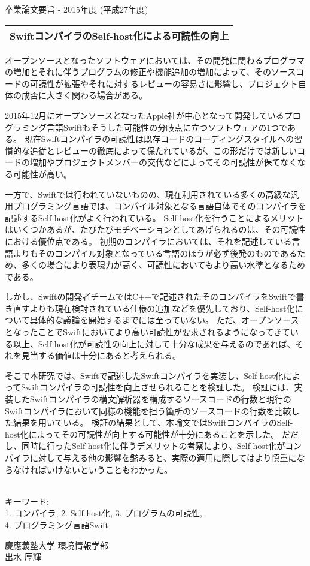 卒業論文要旨 - 2015年度 (平成27年度)
\begin{center}
\begin{Large}
\begin{tabular}{|c|} \hline
SwiftコンパイラのSelf-host化による可読性の向上
\\ \hline
\end{tabular}
\end{Large}
\end{center}

オープンソースとなったソフトウェアにおいては、その開発に関わるプログラマの増加とそれに伴うプログラムの修正や機能追加の増加によって、そのソースコードの可読性が拡張やそれに対するレビューの容易さに影響し、プロジェクト自体の成否に大きく関わる場合がある。

2015年12月にオープンソースとなったApple社が中心となって開発しているプログラミング言語Swiftもそうした可能性の分岐点に立つソフトウェアの1つである。
現在Swiftコンパイラの可読性は既存コードのコーディングスタイルへの習慣的な追従とレビューの徹底によって保たれているが、この形だけでは新しいコードの増加やプロジェクトメンバーの交代などによってその可読性が保てなくなる可能性が高い。

一方で、Swiftでは行われていないものの、現在利用されている多くの高級な汎用プログラミング言語では、コンパイル対象となる言語自体でそのコンパイラを記述するSelf-host化がよく行われている。
Self-host化を行うことによるメリットはいくつかあるが、たびたびモチベーションとしてあげられるのは、その可読性における優位点である。
初期のコンパイラにおいては、それを記述している言語よりもそのコンパイル対象となっている言語のほうが必ず後発のものであるため、多くの場合により表現力が高く、可読性においてもより高い水準となるためである。

しかし、Swiftの開発者チームではC++で記述されたそのコンパイラをSwiftで書き直すよりも現在検討されている仕様の追加などを優先しており、Self-host化について具体的な議論を開始するまでには至っていない。
ただ、オープンソースとなったことでSwiftにおいてより高い可読性が要求されるようになってきている以上、Self-host化が可読性の向上に対して十分な成果を与えるのであれば、それを見当する価値は十分にあると考えられる。

そこで本研究では、Swiftで記述したSwiftコンパイラを実装し、Self-host化によってSwiftコンパイラの可読性を向上させられることを検証した。
検証には、実装したSwiftコンパイラの構文解析器を構成するソースコードの行数と現行のSwiftコンパイラにおいて同様の機能を担う箇所のソースコードの行数を比較した結果を用いている。
検証の結果として、本論文ではSwiftコンパイラのSelf-host化によってその可読性が向上する可能性が十分にあることを示した。
だだし、同時に行ったSelf-host化に伴うデメリットの考察により、Self-host化がコンパイラに対して与える他の影響を鑑みると、実際の適用に際してはより慎重にならなければいけないということもわかった。

~ \\
キーワード:\\
\underline{1. コンパイラ},
\underline{2. Self-host化},
\underline{3. プログラムの可読性},\\
\underline{4. プログラミング言語Swift}
\begin{flushright}
慶應義塾大学 環境情報学部\\
出水 厚輝
\end{flushright}
